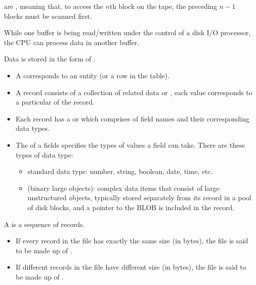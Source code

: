     \par {} are , meaning that, to access the $n$th block on the tape, the preceding $n - 1$ blocks must be scanned first.
  
  \par While one buffer is being read/written under the control of a disk I/O processor, the CPU can process data in another buffer.

    \par Data is stored in the form of .
    \begin{itemize}
      \item A  corresponds to an entity (or a row in the table).
      \item A record consists of a collection of related data  or , each value corresponds to a particular  of the record.
      \item Each record has a  or  which comprises of field names and their corresponding data types.
      \item The  of a fields specifies the types of values a field can take. There are these types of data type:
      \begin{itemize}
        \item standard data type: number, string, boolean, date, time, etc.
        \item {} (binary large objects): complex data items that consist of large unstructured objects, typically stored separately from its record in a pool of disk blocks, and a pointer to the BLOB is included in the record.
      \end{itemize}
    \end{itemize}

  \par A  is a sequence of records.
  \begin{itemize}
    \item If every record in the file has exactly the same size (in bytes), the file is said to be made up of .
    \item If different records in the file have different size (in bytes), the file is said to be made up of .
  \end{itemize}

